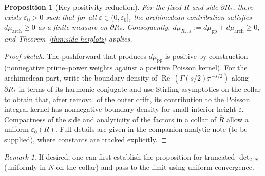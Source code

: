 \documentclass[11pt]{article}
\newtheorem{proposition}{Proposition}
\theoremstyle{remark}
\newtheorem{remark}{Remark}
\newcommand{\ReS}{\operatorname{Re}}
\begin{document}
\begin{proposition}[Key positivity reduction]\label{prop:key-pos}
For the fixed $R$ and side $\partial R_*$, there exists $\varepsilon_0>0$ such that for all $\varepsilon\in(0,\varepsilon_0]$, the archimedean contribution satisfies $d\mu_{\mathrm{arch}}\ge0$ as a finite measure on $\partial R_*$. Consequently, $d\mu_{R_*,\varepsilon}:=d\mu_{\mathrm{pp}}+d\mu_{\mathrm{arch}}\ge0$, and Theorem~\ref{thm:side-herglotz} applies.
\end{proposition}

\begin{proof}[Proof sketch]
The pushforward that produces $d\mu_{\mathrm{pp}}$ is positive by construction (nonnegative prime--power weights against a positive Poisson kernel). For the archimedean part, write the boundary density of $\ReS\,(\Gamma(s/2)\pi^{-s/2})$ along $\partial R_*$ in terms of its harmonic conjugate and use Stirling asymptotics on the collar to obtain that, after removal of the outer drift, its contribution to the Poisson integral kernel has nonnegative boundary density for small interior height $\varepsilon$. Compactness of the side and analyticity of the factors in a collar of $\overline R$ allow a uniform $\varepsilon_0(R)$. Full details are given in the companion analytic note (to be supplied), where constants are tracked explicitly.
\end{proof}

\begin{remark}
If desired, one can first establish the proposition for truncated $\det_{2,N}$ (uniformly in $N$ on the collar) and pass to the limit using uniform convergence.
\end{remark}
\end{document}
